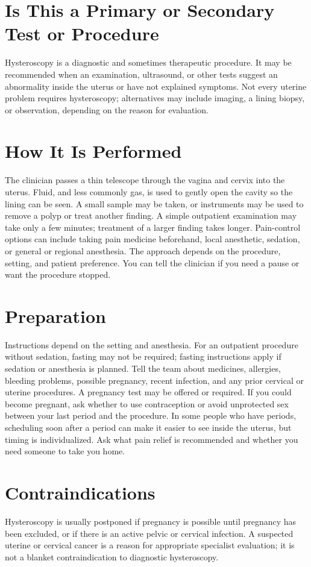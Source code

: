 \section*{Is This a Primary or Secondary Test or Procedure}
Hysteroscopy is a diagnostic and sometimes therapeutic procedure. It may be recommended when an examination, ultrasound, or other tests suggest an abnormality inside the uterus or have not explained symptoms. Not every uterine problem requires hysteroscopy; alternatives may include imaging, a lining biopsy, or observation, depending on the reason for evaluation.

\section*{How It Is Performed}
The clinician passes a thin telescope through the vagina and cervix into the uterus. Fluid, and less commonly gas, is used to gently open the cavity so the lining can be seen. A small sample may be taken, or instruments may be used to remove a polyp or treat another finding. A simple outpatient examination may take only a few minutes; treatment of a larger finding takes longer. Pain-control options can include taking pain medicine beforehand, local anesthetic, sedation, or general or regional anesthesia. The approach depends on the procedure, setting, and patient preference. You can tell the clinician if you need a pause or want the procedure stopped.

\section*{Preparation}
Instructions depend on the setting and anesthesia. For an outpatient procedure without sedation, fasting may not be required; fasting instructions apply if sedation or anesthesia is planned. Tell the team about medicines, allergies, bleeding problems, possible pregnancy, recent infection, and any prior cervical or uterine procedures. A pregnancy test may be offered or required. If you could become pregnant, ask whether to use contraception or avoid unprotected sex between your last period and the procedure. In some people who have periods, scheduling soon after a period can make it easier to see inside the uterus, but timing is individualized. Ask what pain relief is recommended and whether you need someone to take you home.

\section*{Contraindications}
Hysteroscopy is usually postponed if pregnancy is possible until pregnancy has been excluded, or if there is an active pelvic or cervical infection. A suspected uterine or cervical cancer is a reason for appropriate specialist evaluation; it is not a blanket contraindication to diagnostic hysteroscopy.

